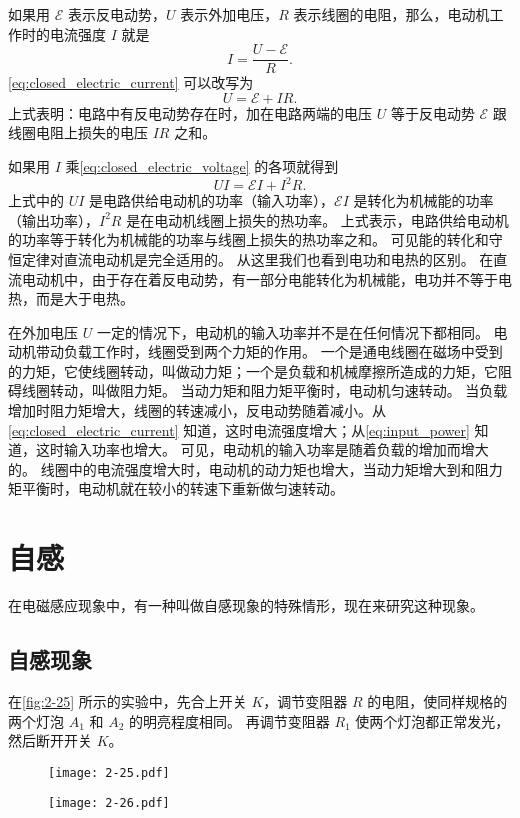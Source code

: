 如果用 $\mathcal{E}$ 表示反电动势，$U$ 表示外加电压，$R$ 表示线圈的电阻，那么，电动机工作时的电流强度 $I$ 就是
\begin{equation}
  \label{eq:closed_electric_current}
  I=\frac{U-\mathcal{E}}{R}.
\end{equation}
\cref{eq:closed_electric_current} 可以改写为
\begin{equation}
  \label{eq:closed_electric_voltage}
  U=\mathcal{E}+IR.
\end{equation}
上式表明：电路中有反电动势存在时，加在电路两端的电压 $U$ 等于反电动势 $\mathcal{E}$ 跟线圈电阻上损失的电压 $IR$ 之和。

如果用 $I$ 乘\cref{eq:closed_electric_voltage} 的各项就得到
\begin{equation}
  \label{eq:input_power}
  UI=\mathcal{E}I+I^2R.
\end{equation}
上式中的 $UI$ 是电路供给电动机的功率（输入功率），$\mathcal{E}I$ 是转化为机械能的功率（输出功率），$I^2R$ 是在电动机线圈上损失的热功率。
上式表示，电路供给电动机的功率等于转化为机械能的功率与线圈上损失的热功率之和。
可见能的转化和守恒定律对直流电动机是完全适用的。
从这里我们也看到电功和电热的区别。
在直流电动机中，由于存在着反电动势，有一部分电能转化为机械能，电功并不等于电热，而是大于电热。

在外加电压 $U$ 一定的情况下，电动机的输入功率并不是在任何情况下都相同。
电动机带动负载工作时，线圈受到两个力矩的作用。
一个是通电线圈在磁场中受到的力矩，它使线圈转动，叫做动力矩；一个是负载和机械摩擦所造成的力矩，它阻碍线圈转动，叫做阻力矩。
当动力矩和阻力矩平衡时，电动机匀速转动。
当负载增加时阻力矩增大，线圈的转速减小，反电动势随着减小。从\cref{eq:closed_electric_current} 知道，这时电流强度增大；从\cref{eq:input_power} 知道，这时输入功率也增大。
可见，电动机的输入功率是随着负载的增加而增大的。
线圈中的电流强度增大时，电动机的动力矩也增大，当动力矩增大到和阻力矩平衡时，电动机就在较小的转速下重新做匀速转动。

\section{自感}
在电磁感应现象中，有一种叫做自感现象的特殊情形，现在来研究这种现象。
\subsection{自感现象}
在\cref{fig:2-25} 所示的实验中，先合上开关 $K$，调节变阻器 $R$ 的电阻，使同样规格的两个灯泡 $A_1$ 和 $A_2$ 的明亮程度相同。
再调节变阻器 $R_1$ 使两个灯泡都正常发光，然后断开开关 $K$。
\begin{figure}
  \begin{minipage}[b]{0.48\linewidth}\centering
    \texttt{[image: 2-25.pdf]}
    \caption{}\label{fig:2-25}
  \end{minipage}
  \begin{minipage}[b]{0.48\linewidth}\centering
    \texttt{[image: 2-26.pdf]}
    \caption{}\label{fig:2-26}
  \end{minipage}
\end{figure}

